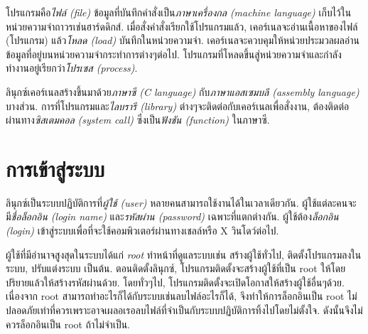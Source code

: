 \begin{thwbr}
โปรแกรมคือ\emph{ไฟล์ (file)} %
ข้อมูลที่บันทึกคำสั่งเป็น\emph{ภาษาเครื่องกล (machine language)}%
เก็บไว้ในหน่วยความจำถาวรเช่นฮาร์ดดิกส์. เมื่อสั่งคำสั่งเรียกใช้โปรแกรมแล้ว, เคอร์เนลจะอ่านเนื้อหาของไฟล์ (โปรแกรม) แล้ว\emph{โหลด (load)} บันทึกในหน่วยความจำ. เคอร์เนลจะควบคุมให้หน่วยประมวลผลอ่านข้อมูลที่อยู่บนหน่วยความจำกระทำการต่างๆต่อไป. โปรแกรมที่โหลดขึ้นสู่หน่วยความจำและกำลังทำงานอยู่เรียกว่า\emph{โปรเซส (process)}.%



ลินุกซ์เคอร์เนลสร้างขึ้นมาด้วย\emph{ภาษาซี (C language)} %
กับ\emph{ภาษาแอสเซมบลี (assembly language)} %
บางส่วน. การที่โปรแกรมและ\emph{ไลบรารี (library)} ต่างๆจะติดต่อกับเคอร์เนลเพื่อสั่งงาน, ต้องติดต่อผ่านทาง\emph{ซิสเตมคอล (system call)} ซึ่งเป็น\emph{ฟังชัน (function)} ในภาษาซี.

\section{การเข้าสู่ระบบ}
ลินุกซ์เป็นระบบปฏิบัติการที่\emph{ผู้ใช้ (user)} หลายคนสามารถใช้งานได้ในเวลาเดียวกัน. ผู้ใช้แต่ละคนจะมี\emph{ชื่อล็อกอิน (login name)} และ\emph{รหัสผ่าน (password)}
เฉพาะที่แตกต่างกัน. ผู้ใช้ต้อง\emph{ล็อกอิน (login)}
เข้าสู่ระบบเพื่อที่จะใช้คอมพิวเตอร์ผ่านทางเชลล์หรือ X วินโดว์ต่อไป. 

ผู้ใช้ที่มีอำนาจสูงสุดในระบบได้แก่ \emph{root} ทำหน้าที่ดูแลระบบเช่น สร้างผู้ใช้ทั่วไป, ติดตั้งโปรแกรมลงในระบบ, ปรับแต่งระบบ เป็นต้น. ตอนติดตั้งลินุกซ์, โปรแกรมติดตั้งจะสร้างผู้ใช้ที่เป็น root ให้โดยปริยายแล้วให้สร้างรหัสผ่านด้วย. โดยทั่วๆไป, โปรแกรมติดตั้งจะเปิดโอกาสให้สร้างผู้ใช้อื่นๆด้วย. เนื่องจาก root สามารถทำอะไรก็ได้กับระบบเช่นลบไฟล์อะไรก็ได้, จึงทำให้การล็อกอินเป็น root ไม่ปลอดภัยเท่าที่ควรเพราะอาจเผลอเรอลบไฟล์ที่จำเป็นกับระบบปฏิบัติการทิ้งไปโดยไม่ตั้งใจ. ดังนั้นจึงไม่ควรล็อกอินเป็น root ถ้าไม่จำเป็น.
%
%

\end{thwbr}
